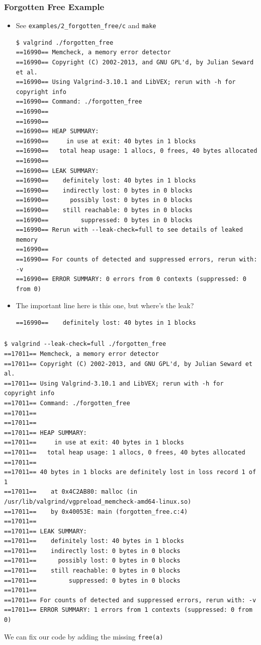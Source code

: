 \documentclass{beamer}
\begin{document}
\begin{frame}[fragile]
  \frametitle{Forgotten Free Example}
  \begin{itemize}
    \item See \texttt{examples/2\_forgotten\_free/c} and \texttt{make}
  \begin{lstlisting}
$ valgrind ./forgotten_free
==16990== Memcheck, a memory error detector
==16990== Copyright (C) 2002-2013, and GNU GPL'd, by Julian Seward et al.
==16990== Using Valgrind-3.10.1 and LibVEX; rerun with -h for copyright info
==16990== Command: ./forgotten_free
==16990==
==16990==
==16990== HEAP SUMMARY:
==16990==     in use at exit: 40 bytes in 1 blocks
==16990==   total heap usage: 1 allocs, 0 frees, 40 bytes allocated
==16990==
==16990== LEAK SUMMARY:
==16990==    definitely lost: 40 bytes in 1 blocks
==16990==    indirectly lost: 0 bytes in 0 blocks
==16990==      possibly lost: 0 bytes in 0 blocks
==16990==    still reachable: 0 bytes in 0 blocks
==16990==         suppressed: 0 bytes in 0 blocks
==16990== Rerun with --leak-check=full to see details of leaked memory
==16990==
==16990== For counts of detected and suppressed errors, rerun with: -v
==16990== ERROR SUMMARY: 0 errors from 0 contexts (suppressed: 0 from 0)
  \end{lstlisting}
\item The important line here is this one, but where's the leak?
\begin{lstlisting}
==16990==    definitely lost: 40 bytes in 1 blocks
\end{lstlisting}
\end{itemize}
\end{frame}

\begin{frame}[fragile]
  \frametitle{}
  \begin{lstlisting}
$ valgrind --leak-check=full ./forgotten_free
==17011== Memcheck, a memory error detector
==17011== Copyright (C) 2002-2013, and GNU GPL'd, by Julian Seward et al.
==17011== Using Valgrind-3.10.1 and LibVEX; rerun with -h for copyright info
==17011== Command: ./forgotten_free
==17011==
==17011==
==17011== HEAP SUMMARY:
==17011==     in use at exit: 40 bytes in 1 blocks
==17011==   total heap usage: 1 allocs, 0 frees, 40 bytes allocated
==17011==
==17011== 40 bytes in 1 blocks are definitely lost in loss record 1 of 1
==17011==    at 0x4C2AB80: malloc (in /usr/lib/valgrind/vgpreload_memcheck-amd64-linux.so)
==17011==    by 0x40053E: main (forgotten_free.c:4)
==17011==
==17011== LEAK SUMMARY:
==17011==    definitely lost: 40 bytes in 1 blocks
==17011==    indirectly lost: 0 bytes in 0 blocks
==17011==      possibly lost: 0 bytes in 0 blocks
==17011==    still reachable: 0 bytes in 0 blocks
==17011==         suppressed: 0 bytes in 0 blocks
==17011==
==17011== For counts of detected and suppressed errors, rerun with: -v
==17011== ERROR SUMMARY: 1 errors from 1 contexts (suppressed: 0 from 0)
  \end{lstlisting}

  We can fix our code by adding the missing \lstinline{free(a)}

\end{frame}
\end{document}
